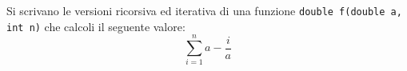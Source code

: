 \begin{Exercise}[label={ex:ricorsione_1}]
    Si scrivano le versioni ricorsiva ed iterativa di una funzione \texttt{double f(double a, int n)}
    che calcoli il seguente valore:
    $$
        \sum_{i=1}^{n} a - \frac{i}{a}
    $$
\end{Exercise}

\begin{Answer}[ref={ex:ricorsione_1}]
  	
\end{Answer}